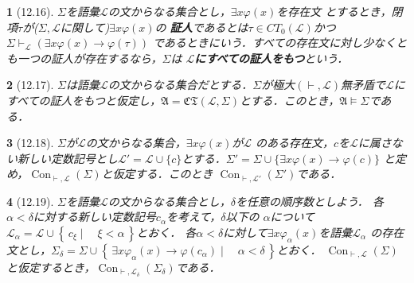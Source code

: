 \documentclass[a4j,10.5pt,oneside,openany]{jsbook}
\theoremstyle{mystyle}
\newtheorem{thm}{\color{DarkMidnightBlue}{定理}}[section]
\newtheorem{dfn}[thm]{\color{PakistanGreen}{定義}}
\newcommand{\Set}[2]{\left\{\, #1 \mid \quad #2\, \right\}} %
\newcommand{\Con}{\operatorname{Con}} %
\begin{document}
	\begin{screen}
		\begin{dfn}[12.16]
			$\Sigma$を語彙$\mathcal{L}$の文からなる集合とし，$\exists x \varphi(x)$を存在文
			とするとき，閉項$\tau$が($\Sigma,\mathcal{L}$に関して)$\exists x \varphi(x)$の
			{\bf 証人}であるとは$\tau \in CT_{0}(\mathcal{L})$かつ$\Sigma
			\vdash_{\mathcal{L}} \left(\exists x \varphi(x) \rightarrow \varphi(\tau)\right)$
			であるときにいう．すべての存在文に対し少なくとも一つの証人が存在するなら，$\Sigma$は
			{\bf $\mathcal{L}$にすべての証人をもつ}という．
		\end{dfn}
	\end{screen}
	
	\begin{screen}
		\begin{thm}[12.17]
			$\Sigma$は語彙$\mathcal{L}$の文からなる集合だとする．$\Sigma$が極大$(\vdash,
			\mathcal{L})$無矛盾で$\mathcal{L}$にすべての証人をもつと仮定し，$\mathfrak{A}
			= \mathfrak{CT}(\mathcal{L},\Sigma)$とする．このとき，$\mathfrak{A} \models
			\Sigma$である．
		\end{thm}
	\end{screen}
	
	\begin{screen}
		\begin{thm}[12.18]
			$\Sigma$が$\mathcal{L}$の文からなる集合，$\exists x \varphi(x)$が$\mathcal{L}$
			のある存在文，$c$を$\mathcal{L}$に属さない新しい定数記号とし$\mathcal{L}'
			= \mathcal{L} \cup \{c\}$とする．$\Sigma' = \Sigma \cup \{\exists x \varphi(x) \rightarrow \varphi(c)\}$
			と定め，$\Con_{\vdash,\mathcal{L}}(\Sigma)$と仮定する．このとき
			$\Con_{\vdash,\mathcal{L}'}(\Sigma')$である．
		\end{thm}
	\end{screen}
	
	\begin{screen}
		\begin{thm}[12.19]
			$\Sigma$を語彙$\mathcal{L}$の文からなる集合とし，$\delta$を任意の順序数としよう．
			各$\alpha < \delta$に対する新しい定数記号$c_{\alpha}$を考えて，$\delta$以下の
			$\alpha$について$\mathcal{L}_{\alpha} = \mathcal{L} \cup \Set{c_{\xi}}{\xi < \alpha}$とおく．
			各$\alpha < \delta$に対して$\exists x \varphi_{\alpha}(x)$を語彙$\mathcal{L}_{\alpha}$
			の存在文とし，$\Sigma_{\delta} = \Sigma \cup \Set{\exists x \varphi_{\alpha}(x) \rightarrow \varphi(c_{\alpha})}{\alpha < \delta}$とおく．
			$\Con_{\vdash,\mathcal{L}}(\Sigma)$と仮定するとき，$\Con_{\vdash,\mathcal{L}_{\delta}}(\Sigma_{\delta})$である．
		\end{thm}
	\end{screen}
	
\end{document}
